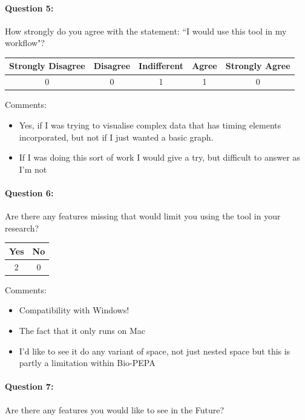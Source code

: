 \paragraph*{Question 5: } How strongly do you agree with the statement: ``I would use this tool in my workflow"?

\begin{center}
\begin{tabular}{ | c | c | c | c | c |}
    \hline
    Strongly Disagree & Disagree  & Indifferent & Agree & Strongly Agree \\
    \hline
    0 & 0 & 1 & 1 & 0 \\
    \hline
\end{tabular}
\end{center}

Comments:
\begin{itemize}
\item Yes, if I was trying to visualise complex data that has timing elements incorporated, but not if I just wanted a basic graph.
\item If I was doing this sort of work I would give a try, but difficult to answer as I'm not
\end{itemize}

\paragraph*{Question 6: } Are there any features missing that would limit you using the tool in your research?

\begin{center}
\begin{tabular}{ | c | c |}
    \hline
    Yes & No\\
    \hline
    2 & 0 \\
    \hline
\end{tabular}
\end{center}

Comments:
\begin{itemize}
\item Compatibility with Windows!
\item The fact that it only runs on Mac
\item I'd like to see it do any variant of space, not just nested space but this is partly a limitation within Bio-PEPA
\end{itemize}

\paragraph*{Question 7: } Are there any features you would like to see in the Future?

